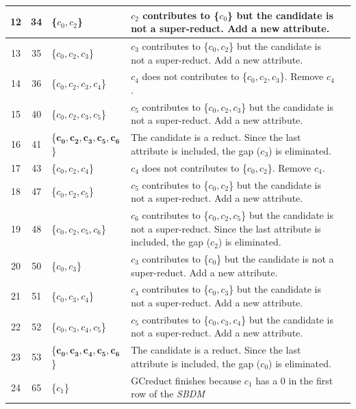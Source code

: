 \documentclass[number,preprint,review,12pt]{elsarticle}
\begin{document}
\begin{table}[!htb]
\begin{tabular}{|c|c|l|l|l|}
					\hline
			12 & 34 & \{$c_0,c_2$\}				& \multicolumn{1}{p{8.5cm}|}{$c_2$ contributes to \{$c_0$\} but the candidate is not a super-reduct. Add a new attribute.}\\
					\hline
			13 & 35 & \{$c_0,c_2,c_3$\}	    	& \multicolumn{1}{p{8.5cm}|}{$c_3$ contributes to \{$c_0,c_2$\} but the candidate is not a super-reduct. Add a new attribute.}\\
					\hline
			14 & 36 & \{$c_0,c_2,c_3,c_4$\}		& \multicolumn{1}{p{8.5cm}|}{$c_4$ does not contributes to \{$c_0,c_2,c_3$\}. Remove $c_4$.}\\
					\hline
			15 & 40 & \{$c_0,c_2,c_3,c_5$\}		& \multicolumn{1}{p{8.5cm}|}{$c_5$ contributes to \{$c_0,c_2,c_3$\} but the candidate is not a super-reduct. Add a new attribute.}\\
					\hline
			16 & 41 & \{$\mathbf{c_0,c_2,c_3,c_5,c_6}$\} & \multicolumn{1}{p{8.5cm}|}{The candidate is a reduct. Since the last attribute is included, the gap ($c_3$) is eliminated.}\\
					\hline
			17 & 43 & \{$c_0,c_2,c_4$\}			& \multicolumn{1}{p{8.5cm}|}{$c_4$ does not contributes to \{$c_0,c_2$\}. Remove $c_4$.}\\
					\hline
			18 & 47 & \{$c_0,c_2,c_5$\}			& \multicolumn{1}{p{8.5cm}|}{$c_5$ contributes to \{$c_0,c_2$\} but the candidate is not a super-reduct. Add a new attribute.}\\
					\hline
			19 & 48 & \{$c_0,c_2,c_5,c_6$\}		& \multicolumn{1}{p{8.5cm}|}{$c_6$ contributes to \{$c_0,c_2,c_5$\} but the candidate is not a super-reduct. Since the last attribute is included, the gap ($c_2$) is eliminated.}\\
					\hline
			20 & 50 & \{$c_0,c_3$\}				& \multicolumn{1}{p{8.5cm}|}{$c_3$ contributes to \{$c_0$\} but the candidate is not a super-reduct. Add a new attribute.}\\    
					\hline		
			21 & 51 & \{$c_0,c_3,c_4$\}			& \multicolumn{1}{p{8.5cm}|}{$c_4$ contributes to \{$c_0,c_3$\} but the candidate is not a super-reduct. Add a new attribute.}\\
					\hline
			22 & 52 & \{$c_0,c_3,c_4,c_5$\}		& \multicolumn{1}{p{8.5cm}|}{$c_5$ contributes to \{$c_0,c_3,c_4$\} but the candidate is not a super-reduct. Add a new attribute.}\\
					\hline
			23 & 53 & \{$\mathbf{c_0,c_3,c_4,c_5,c_6}$\} & \multicolumn{1}{p{8.5cm}|}{The candidate is a reduct. Since the last attribute is included, the gap ($c_0$) is eliminated.}\\
					\hline
			24 & 65 & \{$c_1$\} 				& \multicolumn{1}{p{8.5cm}|}{GCreduct finishes because $c_1$ has a 0 in the first row of the \textit{SBDM}} \\ %
			\hline
		\end{tabular}
	\end{table}
		
\end{document}
